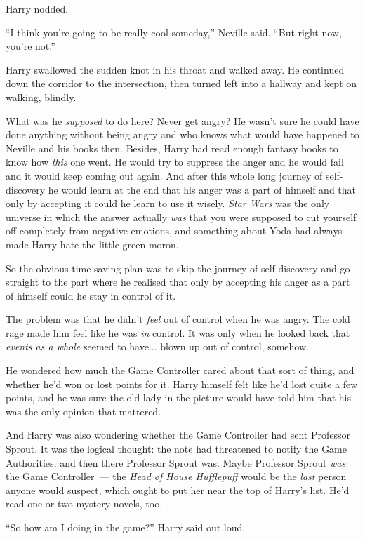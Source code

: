 Harry nodded.

``I think you're going to be really cool someday,'' Neville said. ``But right now, you're not.''

Harry swallowed the sudden knot in his throat and walked away. He continued down the corridor to the intersection, then turned left into a hallway and kept on walking, blindly.

What was he \emph{supposed} to do here? Never get angry? He wasn't sure he could have done anything without being angry and who knows what would have happened to Neville and his books then. Besides, Harry had read enough fantasy books to know how \emph{this} one went. He would try to suppress the anger and he would fail and it would keep coming out again. And after this whole long journey of self-discovery he would learn at the end that his anger was a part of himself and that only by accepting it could he learn to use it wisely. \emph{Star Wars} was the only universe in which the answer actually \emph{was} that you were supposed to cut yourself off completely from negative emotions, and something about Yoda had always made Harry hate the little green moron.

So the obvious time-saving plan was to skip the journey of self-discovery and go straight to the part where he realised that only by accepting his anger as a part of himself could he stay in control of it.

The problem was that he didn't \emph{feel} out of control when he was angry. The cold rage made him feel like he was \emph{in} control. It was only when he looked back that \emph{events as a whole} seemed to have... blown up out of control, somehow.

He wondered how much the Game Controller cared about that sort of thing, and whether he'd won or lost points for it. Harry himself felt like he'd lost quite a few points, and he was sure the old lady in the picture would have told him that his was the only opinion that mattered.

And Harry was also wondering whether the Game Controller had sent Professor Sprout. It was the logical thought: the note had threatened to notify the Game Authorities, and then there Professor Sprout was. Maybe Professor Sprout \emph{was} the Game Controller~--- the \emph{Head of House Hufflepuff} would be the \emph{last} person anyone would suspect, which ought to put her near the top of Harry's list. He'd read one or two mystery novels, too.

``So how am I doing in the game?'' Harry said out loud.

